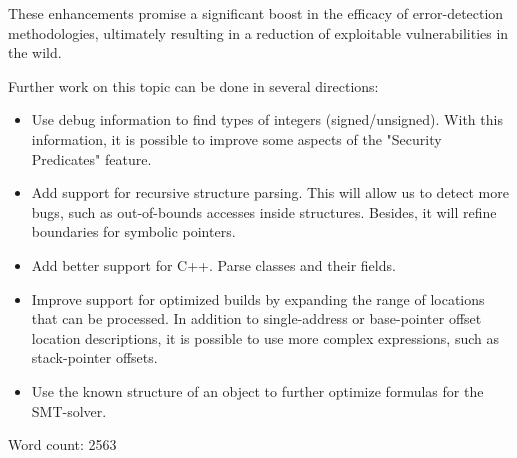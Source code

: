\documentclass[conference]{IEEEtran}
\begin{document}
These enhancements promise a significant boost in the efficacy of error-detection methodologies, ultimately resulting in a reduction of exploitable vulnerabilities in the wild.

\vspace{0.2cm}

Further work on this topic can be done in several directions:

\begin{itemize}
    \item Use debug information to find types of integers (signed/unsigned). With this information, it is possible to improve some aspects of the "Security Predicates" feature.
    \item Add support for recursive structure parsing. This will allow us to detect more bugs, such as out-of-bounds accesses inside structures. Besides, it will refine boundaries for symbolic pointers.
    \item Add better support for C++. Parse classes and their fields.
    \item Improve support for optimized builds by expanding the range of locations that can be processed. In addition to single-address or base-pointer offset location descriptions, it is possible to use more complex expressions, such as stack-pointer offsets.
    \item Use the known structure of an object to further optimize formulas for the SMT-solver.
\end{itemize}








\vspace{0.5cm}

Word count: 2563
\end{document}
